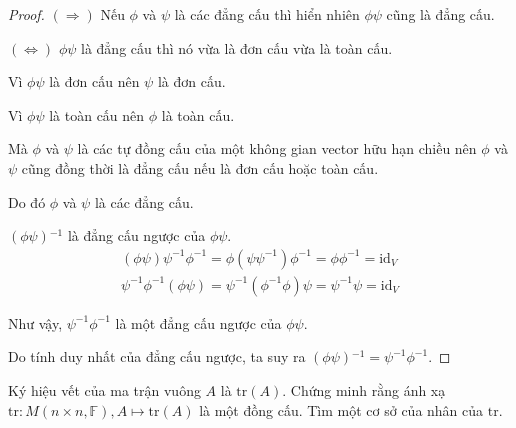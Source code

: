 \documentclass[class=nhvh-linear-algebra,crop=false]{standalone}
\begin{document}
\begin{proof}
    $(\Rightarrow)$ Nếu $\phi$ và $\psi$ là các đẳng cấu thì hiển nhiên $\phi\psi$ cũng là đẳng cấu.
    \par $(\Leftrightarrow)$ $\phi\psi$ là đẳng cấu thì nó vừa là đơn cấu vừa là toàn cấu.
    \par Vì $\phi\psi$ là đơn cấu nên $\psi$ là đơn cấu.
    \par Vì $\phi\psi$ là toàn cấu nên $\phi$ là toàn cấu.
    \par Mà $\phi$ và $\psi$ là các tự đồng cấu của một không gian vector hữu hạn chiều nên $\phi$ và $\psi$ cũng đồng thời là đẳng cấu nếu là đơn cấu hoặc toàn cấu.
    \par Do đó $\phi$ và $\psi$ là các đẳng cấu.
    \bigskip
    \par $(\phi\psi){}^{-1}$ là đẳng cấu ngược của $\phi\psi$.
    \[
        \begin{split}
            (\phi\psi)\psi^{-1}\phi^{-1} = \phi(\psi\psi^{-1})\phi^{-1} = \phi\phi^{-1} = \text{id}_{V} \\
            \psi^{-1}\phi^{-1}(\phi\psi) = \psi^{-1}(\phi^{-1}\phi)\psi = \psi^{-1}\psi = \text{id}_{V}
        \end{split}
    \]
    \par Như vậy, $\psi^{-1}\phi^{-1}$ là một đẳng cấu ngược của $\phi\psi$.
    \par Do tính duy nhất của đẳng cấu ngược, ta suy ra $(\phi\psi){}^{-1} = \psi^{-1}\phi^{-1}$.
\end{proof}

\begin{exercise}
    Ký hiệu vết của ma trận vuông $A$ là $\text{tr}(A)$. Chứng minh rằng ánh xạ $\text{tr}: M(n\times n, \mathbb{F}), A\mapsto \text{tr}(A)$ là một đồng cấu. Tìm một cơ sở của nhân của $\text{tr}$.
\end{exercise}
\end{document}
